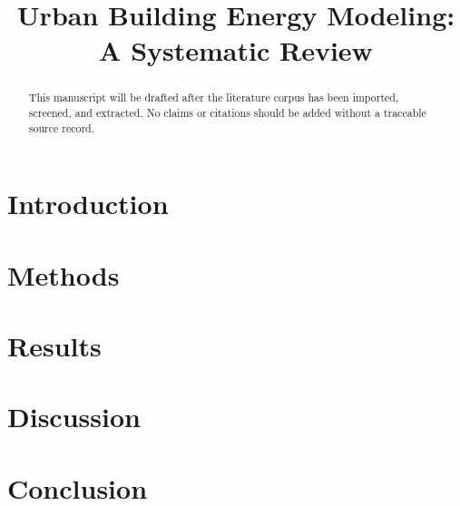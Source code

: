 \documentclass[11pt]{article}
\title{Urban Building Energy Modeling: A Systematic Review}
\author{}
\date{}
\begin{document}
\maketitle

\begin{abstract}
This manuscript will be drafted after the literature corpus has been imported,
screened, and extracted. No claims or citations should be added without a
traceable source record.
\end{abstract}

\section{Introduction}

\section{Methods}

\section{Results}

\section{Discussion}

\section{Conclusion}



\end{document}
